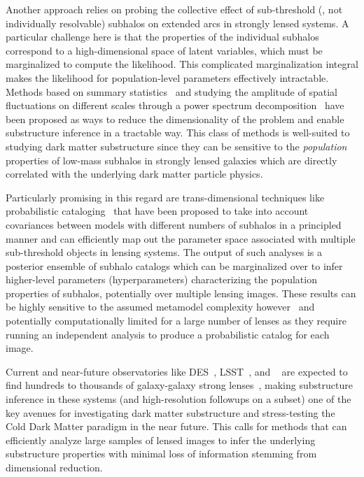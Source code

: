 \documentclass[twocolumn]{aastex63}
\begin{document}
Another approach relies on probing the collective effect of sub-threshold (\ie, not individually resolvable) subhalos on extended arcs in strongly lensed systems. A particular challenge here is that the  properties of the individual subhalos correspond to a high-dimensional space of latent variables, which must be marginalized to compute the likelihood. This complicated marginalization integral makes the likelihood for population-level parameters effectively intractable. Methods based on summary statistics~\citep{1702.00009} and studying the amplitude of spatial fluctuations on different scales through a power spectrum decomposition~\citep{1403.2720,1506.01724,1707.04590,1710.03075,1809.00004,1806.07897,1808.03501} have been proposed as ways to reduce the dimensionality of the problem and enable substructure inference in a tractable way. This class of methods is well-suited to studying dark matter substructure since they can be sensitive to the \emph{population} properties of low-mass subhalos in strongly lensed galaxies which are directly correlated with the underlying dark matter particle physics.

Particularly promising in this regard are trans-dimensional techniques like probabilistic cataloging~\citep{1508.00662,1706.06111} that have been proposed to take into account covariances between models with different numbers of subhalos in a principled manner and can efficiently map out the parameter space associated with multiple sub-threshold objects in lensing systems. The output of such analyses is a posterior ensemble of subhalo catalogs which can be marginalized over to infer higher-level parameters (hyperparameters) characterizing the population properties of subhalos, potentially over multiple lensing images. These results can be highly sensitive to the assumed metamodel complexity however~\citep{1706.06111} and potentially computationally limited for a large number of lenses as they require running an independent analysis to produce a probabilistic catalog for each image.

Current and near-future observatories like DES~\citep{1601.00329}, LSST~\citep{0912.0201,2019arXiv190201055D,1902.05141}, and \Euclid~\citep{1001.0061} are expected to find hundreds to thousands of galaxy-galaxy strong lenses~\citep{1001.2037,1003.5567,2015ApJ...811...20C}, making substructure inference in these systems (and high-resolution followups on a subset) one of the key avenues for investigating dark matter substructure and stress-testing the Cold Dark Matter paradigm in the near future. This calls for methods that can efficiently analyze large samples of lensed images to infer the underlying substructure properties with minimal loss of information stemming from dimensional reduction.
\end{document}
